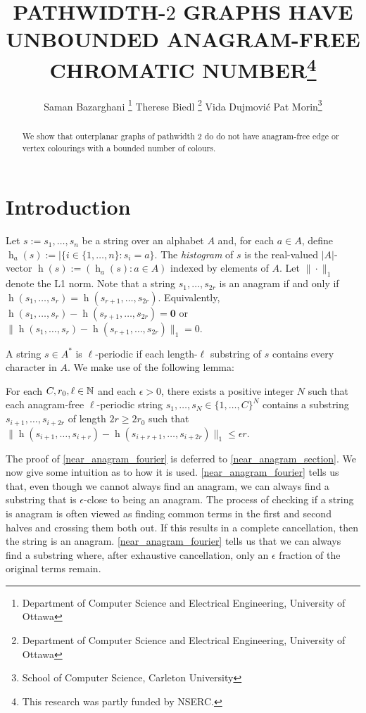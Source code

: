 \documentclass{patmorin}
\title{\MakeUppercase{Pathwidth-$2$ Graphs have Unbounded Anagram-Free Chromatic Number}\thanks{This research was partly funded by NSERC.}}
\author{Saman Bazarghani%
    \thanks{Department of Computer Science and Electrical Engineering, University of Ottawa}\qquad
    Therese Biedl%
    \thanks{Department of Computer Science and Electrical Engineering, University of Ottawa}\qquad
    Vida Dujmović\footnotemark[2]\qquad
    Pat Morin\footnotemark[3]%
    \thanks{School of Computer Science, Carleton University}}
\DeclareMathOperator{\hist}{h}
\begin{document}
\maketitle

\begin{abstract}
    We show that outerplanar graphs of pathwidth $2$ do do not have anagram-free edge or vertex colourings with a bounded number of colours.
\end{abstract}

%


\section{Introduction}

Let $s:=s_1,\ldots,s_n$ be a string over an alphabet $A$ and, for each $a\in A$, define $\hist_a(s):=|\{i\in\{1,\ldots,n\}:s_i=a\}$.  The \emph{histogram} of $s$ is the real-valued $|A|$-vector $\hist(s):=(\hist_a(s):a\in A)$ indexed by elements of $A$.  Let $\|\cdot\|_1$ denote the L1 norm.  Note that a string $s_1,\ldots,s_{2r}$ is an anagram if and only if $\hist(s_1,\ldots,s_r)=\hist(s_{r+1},\ldots,s_{2r})$.  Equivalently, $\hist(s_1,\ldots,s_r)-\hist(s_{r+1},\ldots,s_{2r})=\boldsymbol{0}$ or
$\|\hist(s_1,\ldots,s_r)-\hist(s_{r+1},\ldots,s_{2r})\|_1=0$.

A string $s\in A^*$ is $\ell$-periodic if each length-$\ell$ substring of $s$ contains every character in $A$.  We make use of the following lemma:

\begin{lem}\label{near_anagram_fourier}
    For each $C,r_0,\ell\in\mathbb{N}$ and each $\epsilon>0$, there exists a positive integer $N$ such that each anagram-free $\ell$-periodic string $s_1,\ldots,s_N\in\{1,\ldots,C\}^N$ contains a substring $s_{i+1},\ldots,s_{i+2r}$ of length $2r \ge 2r_0$ such that $\|\hist(s_{i+1},\ldots,s_{i+r})-\hist(s_{i+r+1},\ldots,s_{i+2r})\|_1 \le \epsilon r$.
\end{lem}

The proof of \cref{near_anagram_fourier} is deferred to \cref{near_anagram_section}.  We now give some intuition as to how it is used.  \cref{near_anagram_fourier} tells us that, even though we cannot always find an anagram, we can always find a substring that is $\epsilon$-close to being an anagram.  The process of checking if a string is anagram is often viewed as finding common terms in the first and second halves and crossing them both out.  If this results in a complete cancellation, then the string is an anagram.  \cref{near_anagram_fourier} tells us that we can always find a substring where, after exhaustive cancellation, only an $\epsilon$ fraction of the original terms remain.
\end{document}
